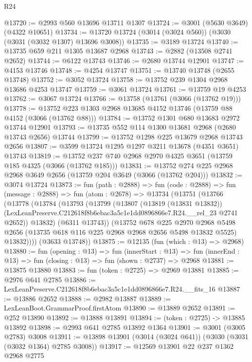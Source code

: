 \begin{lexlean}{R24}
\begin{coremodule}
@13720 := @2993 @560 @13696 @13711 @1307
@13724 := @3001 (@5630 @3649) (@4322 @10651)
@13734 := @13720 @13724 (@3014 (@3024 @560)) (@3030 (@3031 (@3032 @1307) @13696 @3008))
@13735 := @3189 @13724
@13740 := @13735 @659 @211 @1305 @13687 @2968
@13743 := @2882 (@13508 @2741 @2652)
@13744 := @6122 @13743
@13746 := @2680 @13744 @12901
@13747 := @4153 @13746
@13748 := @4254 @13747
@13751 := @13740 @13748 (@2655 @13748)
@13752 := @3052 @13724
@13758 := @13752 @239 @1304 @2968 @13686 @4253 @13747
@13759 := @3061 @13724
@13761 := @13759 @19 @4253
@13762 := @3067 @13724
@13766 := @13758 (@13761 (@3066 (@13762 @19)))
@13778 := @13752 @223 @1303 @2968 @13685 @4152 @13746 (@13759 @88 @4152 (@3066 (@13762 @88)))
@13784 := @13752 @1301 @680 @13683 @2972 @13744 @12901
@13793 := @13735 @552 @114 @1300 @13681 @2968 (@2680 @13743 @2656) @13744
@13799 := @13752 @1298 @225 @13679 @2968 @13743 @2656
@13807 := @3599 @13724 @1295 @1297 @3211 @13678 (@4351 @3651) @13743
@13819 := @13752 @237 @740 @2968 @2970 @4325 @3651 (@13759 @185 @4325 (@3066 (@13762 @185)))
@13831 := @13752 @274 @225 @2968 @2968 @3649 @2656 (@13759 @204 @3649 (@3066 (@13762 @204)))
@13832 := @3074 @13724
@13873 := fun (path : @2888) =>
  fun (code : @2888) =>
  fun (message : @2888) =>
  fun (atom : @2678) =>
  @13734
    (@13751
      (@13766
        (@13778
          (@13784
            (@13793
              (@13799
                (@13807
                  (@13819 (@13831 @13832))
                  (LexLeanPreserve.C212618f8b6ebac3a5c1e1dd0896866e7.R24.__rel_23 @2741 @2652))
                @13832)
              (@6311 @13743))
            (@13752
              @678
              @225
              @2970
              @2968
              @5498
              @2656
              (@13735 @618 @116 @225 @2968 @2968 @2656 @5498 @13832 @5525)
              @13832))))
      (@3633 @13748))
@13875 := @12135 (fun (which : @13) => @2968)
@13880 := fun (opening : @13) =>
  fun (innerStart : @13) =>
  fun (innerEnd : @13) => fun (closing : @13) => fun (shown : @2737) => @2968
@13881 := @13875 @13880
@13883 := fun (token : @2725) => @2969 @13881
@13885 := @2976 @641 @2785
@13886 := LexLeanPreserve.C212618f8b6ebac3a5c1e1dd0896866e7.R24.__fits_16
@13887 := @13886 @2652
@13888 := @2982 @13887
@13889 := LexLeanBoot.GrammarProof.firstAtom
@13890 := @13889 @2652
@13891 := @252 @13890
@13892 := @13888 @13891
@13894 := (token : @2725) -> @13885 @13892
@13898 := @2993 @641 @2785 @13892 @1364
@13901 := @3001 (@3005 @2783) @3008
@13911 := @13898 @13901 (@3014 (@3024 @641)) (@3030 (@3031 (@3032 @1364) @2785 @3008))
@13917 := @12569 @13901 @22 @237 @1362 @2968 @2775

\end{coremodule}
\end{lexlean}
